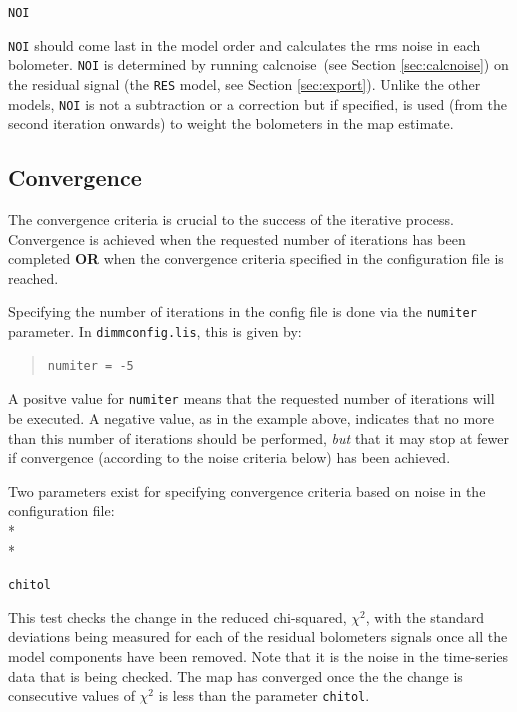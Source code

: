 \documentclass[twoside,11pt]{article}
\newcommand{\xref}[3]{#1}
\newcommand{\xlabel}[1]{}
\renewcommand{\_}{\texttt{\symbol{95}}}
\newenvironment{myquote}{\begin{quote}\begin{small}}{\end{small}\end{quote}}
\newcommand{\task}[1]{\textsf{#1}}
\newcommand{\calcnoise}{\xref{\task{calcnoise}}{sun258}{CALCNOISE}}
\begin{document}
\begin{minipage}[t]{0.07\linewidth}
\texttt{NOI}
\end{minipage}
\begin{minipage}[t]{0.92\linewidth}\texttt{NOI} should come last in the model order and calculates the rms noise in each bolometer.   \texttt{NOI} is determined by running \calcnoise\ (see Section \ref{sec:calcnoise}) on the residual signal (the \texttt{RES} model, see Section \ref{sec:export}).  Unlike the other models, \texttt{NOI} is not a subtraction or a correction but if specified, is used (from the second iteration onwards) to weight the bolometers in the map estimate.
\end{minipage}

\subsection{\xlabel{convergence}Convergence}
\label{sec:converge}
The convergence criteria is crucial to the success of the iterative process. Convergence is achieved when the requested number of iterations has been completed \textbf{OR} when the convergence criteria  specified in the configuration file is reached. 

Specifying the number of iterations in the config file is done via the \texttt{numiter} parameter. In \texttt{dimmconfig.lis}, this is given by:
\vspace{-0.1cm}
\begin{myquote}
\begin{verbatim}
numiter = -5
\end{verbatim}
\end{myquote}
\vspace{-0.2cm}
A positve value for \texttt{numiter} means that the requested number of iterations will be executed. A negative value, as in the example above,  indicates that no more than this number of iterations should be performed, \emph{but} that it may stop at fewer if convergence (according to the noise criteria below) has been achieved. 

Two parameters exist for specifying convergence criteria based on noise in the configuration file:
\\*\\*
\begin{minipage}[t]{0.1\linewidth}
\texttt{chitol}
\end{minipage}
\begin{minipage}[t]{0.9\linewidth}This test checks the change in the reduced chi-squared, $\chi^2$, with the standard deviations being measured for each of the residual bolometers signals once all the model components have been removed. Note that it is the noise in the time-series data that is being checked. The map has converged once the the change is consecutive values of  $\chi^2$ is less than the parameter \texttt{chitol}.
\end{minipage}
\vspace{2mm}
\end{document}

